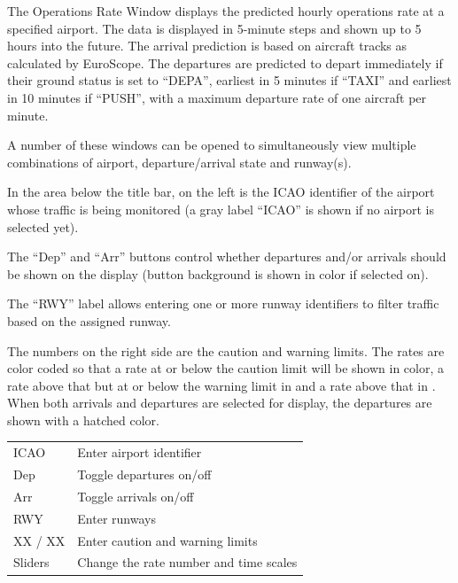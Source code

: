 \documentclass[a4paper,oneside,11pt]{memoir}
\begin{document}
\bigskip


The Operations Rate Window displays the predicted hourly operations rate at a specified airport. The data is displayed in 5-minute steps and shown up to 5 hours into the future. The arrival prediction is based on aircraft tracks as calculated by EuroScope. The departures are predicted to depart immediately if their ground status is set to “DEPA”, earliest in 5 minutes if “TAXI” and earliest in 10 minutes if “PUSH”, with a maximum departure rate of one aircraft per minute.

\bigskip

A number of these windows can be opened to simultaneously view multiple combinations of airport, departure/arrival state and runway(s).

\bigskip

In the area below the title bar, on the left is the ICAO identifier of the airport whose traffic is being monitored (a gray label “ICAO” is shown if no airport is selected yet).

\bigskip

The “Dep” and “Arr” buttons control whether departures and/or arrivals should be shown on the display (button background is shown in  color if selected on).

\bigskip

The “RWY” label allows entering one or more runway identifiers to filter traffic based on the assigned runway.

\bigskip

The numbers on the right side are the caution and warning limits. The rates are color coded so that a rate at or below the caution limit will be shown in  color, a rate above that but at or below the warning limit in  and a rate above that in . When both arrivals and departures are selected for display, the departures are shown with a hatched color.

\begin{longtable}{p{2.5cm} p{10cm}}
    ICAO        & Enter airport identifier\\
    Dep         & Toggle departures on/off\\
    Arr         & Toggle arrivals on/off\\
    RWY         & Enter runways\\
    XX / XX     & Enter caution and warning limits\\
    Sliders     & Change the rate number and time scales  \\  
\end{longtable}
\end{document}
